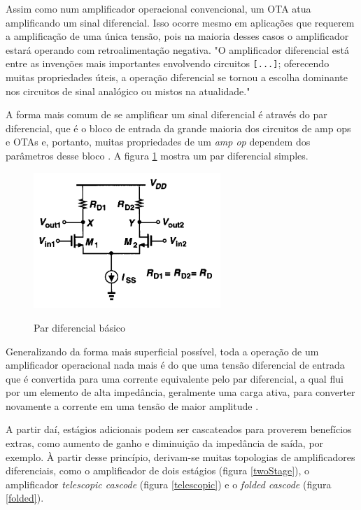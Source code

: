 \documentclass[
	12pt,				%
	oneside,			%
	a4paper,			%
	english,			%
	french,				%
	spanish,			%
	brazil				%
	]{abntex2}
\begin{document}
Assim como num amplificador operacional convencional, um OTA atua amplificando um sinal diferencial. Isso ocorre mesmo em aplicações que requerem a amplificação de uma única tensão, pois na maioria desses casos o amplificador estará operando com retroalimentação negativa.
"O amplificador diferencial está entre as invenções mais importantes envolvendo circuitos \verb|[...]|; oferecendo muitas propriedades úteis, a operação diferencial se tornou a escolha dominante nos circuitos de sinal analógico ou mistos na atualidade." \cite{razavi}

A forma mais comum de se amplificar um sinal diferencial é através do par diferencial, que é o bloco de entrada da grande maioria dos circuitos de amp ops e OTAs e, portanto, muitas propriedades de um \textit{amp op} dependem dos parâmetros desse bloco \cite{dehghani2013design}. A figura \ref{parDiff} mostra um par diferencial simples.
\begin{figure}[!ht]
  \centering
  \includegraphics[width=200pt]{parDiff.PNG}\\
  \caption{Par diferencial básico}\label{parDiff}
\end{figure}

Generalizando da forma mais superficial possível, toda a operação de um amplificador operacional nada mais é do que uma tensão diferencial de entrada que é convertida para uma corrente equivalente pelo par diferencial, a qual flui por um elemento de alta impedância, geralmente uma carga ativa, para converter novamente a corrente em uma tensão de maior amplitude \cite{dehghani2013design}.

A partir daí, estágios adicionais podem ser cascateados para proverem benefícios extras, como aumento de ganho e diminuição da impedância de saída, por exemplo. À partir desse princípio, derivam-se muitas topologias de amplificadores diferenciais, como o amplificador de dois estágios (figura \ref{twoStage}), o amplificador \textit{telescopic cascode} (figura \ref{telescopic}) e o \textit{folded cascode} (figura \ref{folded}).
\end{document}
